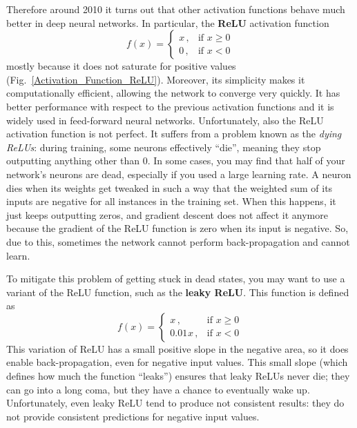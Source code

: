 Therefore around 2010 it turns out that other activation functions behave much better in deep neural networks. In particular, the \textbf{ReLU} activation function
\begin{equation}
f(x)=\begin{cases}
x\,,&\text{if $x\geq0$}\\
0\,,&\text{if $x<0$}
\end{cases}
\end{equation}
mostly because it does not saturate for positive values (Fig.~\ref{Activation_Function_ReLU}). Moreover, its simplicity makes it computationally efficient, allowing the network to converge very quickly. It has better performance with respect to the previous activation functions and it is widely used in feed-forward neural networks. Unfortunately, also the ReLU activation function is not perfect. It suffers from a problem known as the \emph{dying ReLUs}: during training, some neurons effectively ``die'', meaning they stop outputting anything other than 0. In some cases, you may find that half of your network's neurons are dead, especially if you used a large learning rate. A neuron dies when its weights get tweaked in such a way that the weighted sum of its inputs are negative for all instances in the training set. When this happens, it just keeps outputting zeros, and gradient descent does not affect it anymore because the gradient of the ReLU function is zero when its input is negative. So, due to this, sometimes the network cannot perform back-propagation and cannot learn.

To mitigate this problem of getting stuck in dead states, you may want to use a variant of the ReLU function, such as the \textbf{leaky ReLU}. This function is defined as
\begin{equation}
f(x)=\begin{cases}
x\,,&\text{if $x\geq0$}\\
0.01\mspace{1mu}x\,,&\text{if $x<0$}
\end{cases}
\end{equation}
This variation of ReLU has a small positive slope in the negative area, so it does enable back-propagation, even for negative input values. This small slope (which defines how much the function ``leaks'') ensures that leaky ReLUs never die; they can go into a long coma, but they have a chance to eventually wake up. Unfortunately, even leaky ReLU tend to produce not consistent results: they do not provide consistent predictions for negative input values.

